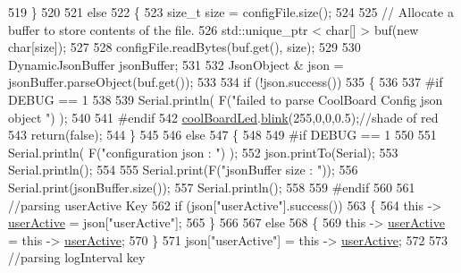 \begin{DoxyCode}
519     \}
520 
521     \textcolor{keywordflow}{else}
522     \{
523         \textcolor{keywordtype}{size\_t} size = configFile.size();
524 
525         \textcolor{comment}{// Allocate a buffer to store contents of the file.}
526         std::unique\_ptr < char[] > buf(\textcolor{keyword}{new} \textcolor{keywordtype}{char}[size]);
527 
528         configFile.readBytes(buf.get(), size);
529 
530         DynamicJsonBuffer jsonBuffer;
531 
532         JsonObject & json = jsonBuffer.parseObject(buf.get());
533 
534         \textcolor{keywordflow}{if} (!json.success())
535         \{
536         
537 \textcolor{preprocessor}{        #if DEBUG == 1}
538 
539             Serial.println( F(\textcolor{stringliteral}{"failed to parse CoolBoard Config json object "}) );
540     
541 \textcolor{preprocessor}{        #endif}
542             \hyperlink{classCoolBoard_a1b1d3c684a5baa56b08486e192fd8e97}{coolBoardLed}.\hyperlink{classCoolBoardLed_a96e1ea13003eee34c9dbcef340404426}{blink}(255,0,0,0.5);\textcolor{comment}{//shade of red     }
543             \textcolor{keywordflow}{return}(\textcolor{keyword}{false});
544         \}
545 
546         \textcolor{keywordflow}{else}
547         \{   
548         
549 \textcolor{preprocessor}{        #if DEBUG == 1}
550             
551             Serial.println( F(\textcolor{stringliteral}{"configuration json : "}) );
552             json.printTo(Serial);
553             Serial.println();
554             
555             Serial.print(F(\textcolor{stringliteral}{"jsonBuffer size : "}));
556             Serial.print(jsonBuffer.size());
557             Serial.println();
558 
559 \textcolor{preprocessor}{        #endif}
560             
561             \textcolor{comment}{//parsing userActive Key}
562             \textcolor{keywordflow}{if} (json[\textcolor{stringliteral}{"userActive"}].success())
563             \{
564                 \textcolor{keyword}{this} -> \hyperlink{classCoolBoard_a6395459131d6889a3005f79c7a35e964}{userActive} = json[\textcolor{stringliteral}{"userActive"}];
565             \}
566 
567             \textcolor{keywordflow}{else}
568             \{
569                 \textcolor{keyword}{this} -> \hyperlink{classCoolBoard_a6395459131d6889a3005f79c7a35e964}{userActive} = \textcolor{keyword}{this} -> \hyperlink{classCoolBoard_a6395459131d6889a3005f79c7a35e964}{userActive};
570             \}
571             json[\textcolor{stringliteral}{"userActive"}] = \textcolor{keyword}{this} -> \hyperlink{classCoolBoard_a6395459131d6889a3005f79c7a35e964}{userActive};
572 
573             \textcolor{comment}{//parsing logInterval key}

\end{DoxyCode}
